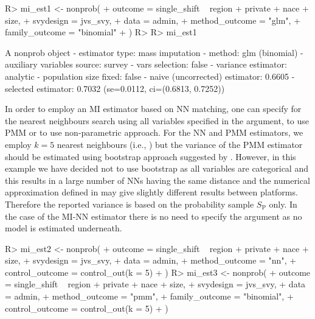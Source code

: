 \documentclass[nojss]{jss}
\begin{document}
\begin{CodeChunk}
\begin{CodeInput}
R> mi_est1 <- nonprob(
+   outcome = single_shift ~ region + private + nace + size,
+   svydesign = jvs_svy,
+   data = admin,
+   method_outcome = "glm",
+   family_outcome = "binomial"
+ )
R> 
R> mi_est1
\end{CodeInput}
\begin{CodeOutput}
A nonprob object
 - estimator type: mass imputation
 - method: glm (binomial)
 - auxiliary variables source: survey
 - vars selection: false
 - variance estimator: analytic
 - population size fixed: false
 - naive (uncorrected) estimator: 0.6605
 - selected estimator: 0.7032 (se=0.0112, ci=(0.6813, 0.7252))
\end{CodeOutput}
\end{CodeChunk}

In order to employ an MI estimator based on NN matching, one can specify
 for the nearest neighbours search using
all variables specified in the  argument,
 to use PMM or
 to use non-parametric approach. For the
NN and PMM estimators, we employ \(k=5\) nearest neighbours (i.e.,
) but the variance of the PMM estimator should
be estimated using bootstrap approach suggested by
\citet{chlebicki2025}. However, in this example we have decided not to
use bootstrap as all variables are categorical and this results in a
large number of NNs having the same distance and the numerical
approximation defined in  may give slightly
different results between platforms. Therefore the reported variance is
based on the probability sample \(S_{\text{P}}\) only. In the case of
the MI-NN estimator there is no need to specify the
 argument as no model is estimated underneath.

\begin{CodeChunk}
\begin{CodeInput}
R> mi_est2 <- nonprob(
+   outcome = single_shift ~ region + private + nace + size,
+   svydesign = jvs_svy,
+   data = admin,
+   method_outcome = "nn",
+   control_outcome = control_out(k = 5)
+ )
R> mi_est3 <- nonprob(
+   outcome = single_shift ~ region + private + nace + size,
+   svydesign = jvs_svy,
+   data = admin,
+   method_outcome = "pmm",
+   family_outcome = "binomial", 
+   control_outcome = control_out(k = 5)
+ )
\end{CodeInput}
\end{CodeChunk}
\end{document}
